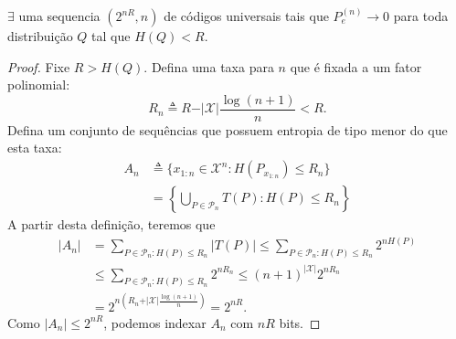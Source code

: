 \begin{theorem}\label{thm:teocodshannontipos}
$\exists$ uma sequencia $(2^{nR},n)$ de códigos universais tais que $P_e^{(n)} \rightarrow 0$ para toda
distribuição $Q$ tal que $H(Q) < R$.
\end{theorem}
\begin{proof}
  Fixe $R > H(Q)$. Defina uma taxa para $n$ que é fixada a um fator polinomial:
  \begin{equation}
    R_n \triangleq R - \vert \mathcal{X} \vert \frac{\log (n+1)}{n} < R .
  \end{equation}
  Defina um conjunto de sequências que possuem entropia de tipo menor do que esta taxa:
  \begin{subequations}
    \begin{align}
       A_n &\triangleq \{ x_{1:n} \in \mathcal{X}^n : H(P_{x_{1:n}}) \leq R_n \} \\
           &= \left\{  \bigcup_{P \in \mathcal{P}_n} T(P) : H(P) \leq R_n \right\}
    \end{align}
  \end{subequations}
  A partir desta definição, teremos que
  \begin{subequations}
  \begin{align}
    \vert A_n \vert &= \sum_{P \in \mathcal{P}_n : H(P) \leq R_n} \vert T(P) \vert \leq \sum_{P \in \mathcal{P}_n : H(P) \leq R_n} 2^{nH(P)} \\
                    &\leq \sum_{P \in \mathcal{P}_n : H(P) \leq R_n} 2^{nR_n} \leq (n+1)^{\vert \mathcal{X} \vert} 2^{nR_n} \\
                    &= 2^{n \left( R_n + \vert \mathcal{X} \vert \frac{\log (n+1)}{n} \right)} = 2^{nR} .
  \end{align}
  \end{subequations}
  Como $\vert A_n \vert \leq 2^{nR}$, podemos indexar $A_n$ com $nR$ bits.


\end{proof}
